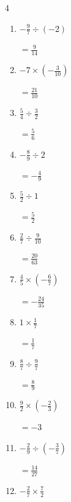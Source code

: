 \begin{multicols}{4}
\begin{enumerate}
        $\displaystyle =-4$

  \item $\displaystyle -\frac{9}{7}\div{}\left(-2\right)$

        $\displaystyle =\frac{9}{14}$

  \item $\displaystyle -7\times{}\left(-\frac{3}{10}\right)$

        $\displaystyle =\frac{21}{10}$

  \item $\displaystyle \frac{5}{4}\div{}\frac{3}{2}$

        $\displaystyle =\frac{5}{6}$

  \item $\displaystyle -\frac{8}{9}\div{}2$

        $\displaystyle =-\frac{4}{9}$

  \item $\displaystyle \frac{5}{2}\div{}1$

        $\displaystyle =\frac{5}{2}$

\columnbreak %

  \item $\displaystyle \frac{2}{7}\div{}\frac{9}{10}$

        $\displaystyle =\frac{20}{63}$

  \item $\displaystyle \frac{4}{5}\times{}\left(-\frac{6}{7}\right)$

        $\displaystyle =-\frac{24}{35}$

  \item $\displaystyle 1\times{}\frac{1}{7}$

        $\displaystyle =\frac{1}{7}$

  \item $\displaystyle \frac{8}{7}\div{}\frac{9}{7}$

        $\displaystyle =\frac{8}{9}$

  \item $\displaystyle \frac{9}{2}\times{}\left(-\frac{2}{3}\right)$

        $\displaystyle =-3$

  \item $\displaystyle -\frac{2}{9}\div{}\left(-\frac{3}{7}\right)$

        $\displaystyle =\frac{14}{27}$

  \item $\displaystyle -\frac{2}{7}\times{}\frac{7}{2}$


\end{enumerate}
\end{multicols}
